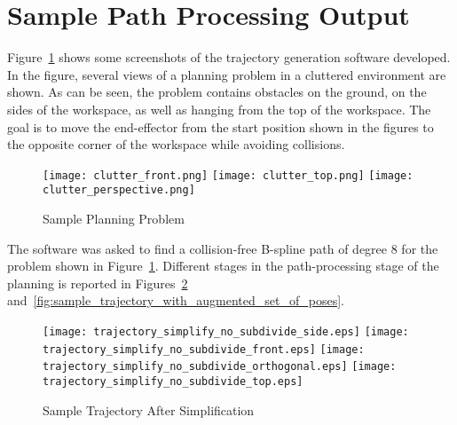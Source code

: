 \section{Sample Path Processing Output}%

	Figure~\ref{fig:sample_planning_problem} shows some screenshots of the
	trajectory generation software developed. In the figure, several views
	of a planning problem in a cluttered environment are shown. As can be
	seen, the problem contains obstacles on the ground, on the sides of the
	workspace, as well as hanging from the top of the workspace. The goal is
	to move the end-effector from the start position shown in the figures to
	the opposite corner of the workspace while avoiding collisions.

	\begin{figure}[hbt]
		\centering
		\texttt{[image: clutter\_front.png]}
		\texttt{[image: clutter\_top.png]}
		\texttt{[image: clutter\_perspective.png]}
		\caption{Sample Planning Problem}
		\label{fig:sample_planning_problem}
	\end{figure}

	The software was asked to find a collision-free B-spline path of degree 8
	for the problem shown in Figure~\ref{fig:sample_planning_problem}. Different
	stages in the path-processing stage of the planning is reported in
	Figures~\ref{fig:sample_trajectory_after_simplification}
	and~\ref{fig:sample_trajectory_with_augmented_set_of_poses}.


	\begin{figure}[hb]
		\centering
		\begin{minipage}{0.5\linewidth}
			\texttt{[image: trajectory\_simplify\_no\_subdivide\_side.eps]}
			\texttt{[image: trajectory\_simplify\_no\_subdivide\_front.eps]}
			\texttt{[image: trajectory\_simplify\_no\_subdivide\_orthogonal.eps]}
			\texttt{[image: trajectory\_simplify\_no\_subdivide\_top.eps]}
		\end{minipage}
		\caption{Sample Trajectory After Simplification}
		\label{fig:sample_trajectory_after_simplification}
	\end{figure}


